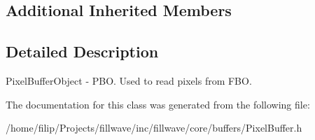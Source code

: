 \subsection*{Additional Inherited Members}


\subsection{Detailed Description}
Pixel\+Buffer\+Object -\/ P\+BO. Used to read pixels from F\+BO. 

The documentation for this class was generated from the following file\+:\begin{DoxyCompactItemize}
\item 
/home/filip/\+Projects/fillwave/inc/fillwave/core/buffers/Pixel\+Buffer.\+h\end{DoxyCompactItemize}
